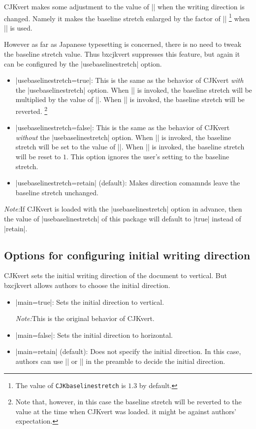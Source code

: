 \documentclass[a4paper]{article}
\newcommand{\Pkg}[1]{\textsf{#1}}
\newcommand{\Note}{\par\noindent \emph{Note:}\quad}
\newcommand{\Means}{:\hspace{1em plus 1em}}
\newcommand{\Cs}[1]{\texttt{\symbol{`\\}#1}}
\begin{document}
\Pkg{CJKvert} makes some adjustment to the value of |\baselinestretch|
when the writing direction is changed.
Namely it makes the baseline stretch enlarged by the factor of
|\CJKbaselinestretch|%
\footnote{The value of \Cs{CJKbaselinestretch} is $1.3$ by default.}
when |\CJKvert| is used.

However as far as Japanese typesetting is concerned,
there is no need to tweak the baseline stretch value.
Thus \Pkg{bxcjkvert} suppresses this feature, but again
it can be configured by the |usebaselinestretch| option.


\begin{itemize}
\item |usebaselinestretch=true|\Means
  This is the same as the behavior of \Pkg{CJKvert} \emph{with}
  the |usebaselinestretch| option.
  When |\CJKvert| is invoked, the baseline stretch will be multiplied
  by the value of |\CJKbaselinestretch|.
  When |\CJKhorz| is invoked, the baseline stretch will be reverted.%
  \footnote{Note that, however, in this case the baseline stretch will
    be reverted to the value at the time when \Pkg{CJKvert} was loaded.
    it might be against authors' expectation.}
\item |usebaselinestretch=false|\Means
  This is the same as the behavior of \Pkg{CJKvert} \emph{without}
  the |usebaselinestretch| option.
  When |\CJKvert| is invoked, the baseline stretch will be set
  to the value of |\CJKbaselinestretch|.
  When |\CJKhorz| is invoked, the baseline stretch will be
  reset to $1$.
  This option ignores the user's setting to the baseline stretch.
\item |usebaselinestretch=retain| (default)\Means
  Makes direction comamnds leave the baseline stretch
  unchanged.
\end{itemize}

\Note If \Pkg{CJKvert} is loaded with the |usebaselinestretch|
option in advance,
then the value of |usebaselinestretch| of this package
will default to |true| instead of |retain|.

\subsection{Options for configuring initial writing direction}

\Pkg{CJKvert} sets the initial writing direction of the document
to vertical.
But \Pkg{bxcjkvert} allows authors to choose the initial direction.

\begin{itemize}
\item |main=true|\Means
  Sets the initial direction to vertical.
  \Note This is the original behavior of \Pkg{CJKvert}.
\item |main=false|\Means
  Sets the initial direction to horizontal.
\item |main=retain| (default)\Means
  Does not specify the initial direction.
  In this case, authors can use |\CJKvert| or |\CJKhorz|
  in the preamble to decide the initial direction.
\end{itemize}

\end{document}
